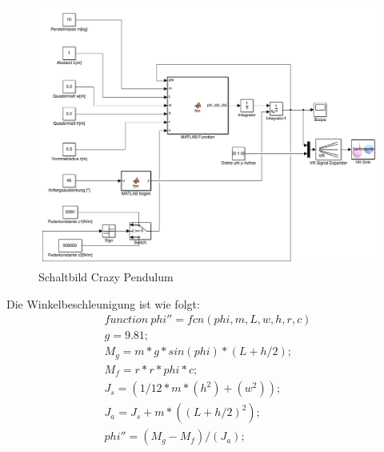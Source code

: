 \documentclass[10pt,a4paper]{article}
\begin{document}
 	\begin{figure}[H]
 		\centering
 		\includegraphics[width=1\textwidth]{../aufgabe2/simulink.png}
 		\caption{Schaltbild Crazy Pendulum}
 	\end{figure}
 	Die Winkelbeschleunigung ist wie folgt:
 	\begin{align}
 	function \: phi'' = fcn(phi, m, L, w, h, r, c)
 	\\g = 9.81; \nonumber
 	\\M_g = m * g * sin(phi)*(L+h/2);\nonumber
 	\\M_f = r * r * phi * c;\nonumber
 	\\J_s = (1/12 * m * (h^2) + (w^2));\nonumber
 	\\J_a = J_s + m * ((L+h/2)^2);\nonumber
 	\\phi'' = ( M_g - M_f ) / ( J_a );\nonumber
 	\end{align}
 	
\end{document}
